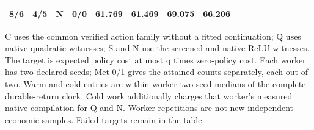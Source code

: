 \begin{table}[htbp]
{\begin{tabular}{lcccrrrr}
8/6 & 4/5 & N & 0/0 & 61.769 & 61.469 & 69.075 & 66.206 \\
\hline\end{tabular}}
\par\smallskip
{\footnotesize C uses the common verified action family without a fitted continuation; Q uses native quadratic witnesses; S and N use the screened and native ReLU witnesses. The target is expected policy cost at most q times zero-policy cost. Each worker has two declared seeds; Met 0/1 gives the attained counts separately, each out of two. Warm and cold entries are within-worker two-seed medians of the complete durable-return clock. Cold work additionally charges that worker's measured native compilation for Q and N. Worker repetitions are not new independent economic samples. Failed targets remain in the table.}
\end{table}
